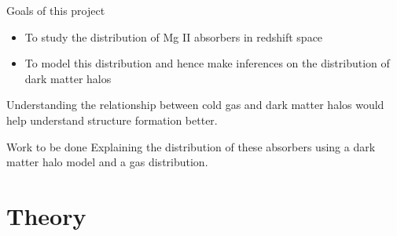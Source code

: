\documentclass{beamer}
\begin{document}
		\begin{frame}{Goals of this project}
			\begin{itemize}
				\item To study the distribution of Mg II absorbers in redshift space
				\item To model this distribution and hence make inferences on the distribution of dark matter halos
			\end{itemize}
			Understanding the relationship between cold gas and dark matter halos would help understand structure formation better.
			\begin{block}{Work to be done}
				Explaining the distribution of these absorbers using a dark matter halo model and a gas distribution.
			\end{block}
		\end{frame}
\section{Theory}
\end{document}
